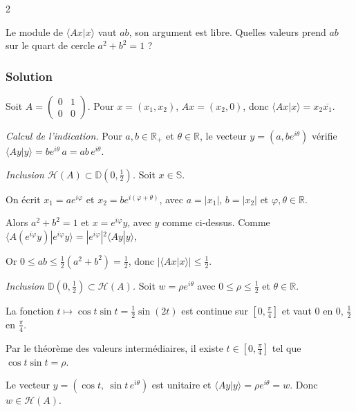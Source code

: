 \documentclass[11pt,a4paper]{article}
\newcommand{\equationajustee}[1]{%
  \sbox{\boiteequation}{$\displaystyle #1$}%
  \ifdim\wd\boiteequation>\linewidth
    \[\resizebox{\linewidth}{!}{\usebox{\boiteequation}}\]%
  \else
    \[#1\]%
  \fi}
\begin{document}
\begin{indication}{2}

Le module de \(\langle Ax|x\rangle\) vaut \(ab\), son argument est libre. Quelles valeurs prend \(ab\) sur le quart de cercle \(a^2+b^2=1\) ?

\end{indication}

\hypertarget{solution-20}{%
\subsubsection{Solution}\label{solution-20}}

Soit \(A=\begin{pmatrix}0&1\\0&0\end{pmatrix}\). Pour \(x=(x_1,x_2)\), \(Ax=(x_2,0)\), donc \(\langle Ax|x\rangle=x_2\overline{x_1}\).

\emph{Calcul de l'indication.} Pour \(a,b\in\mathbb R_+\) et \(\theta\in\mathbb R\), le vecteur \(y=(a,be^{i\theta})\) vérifie \(\langle Ay|y\rangle=be^{i\theta}\,a=ab\,e^{i\theta}\).

\emph{Inclusion \(\mathcal H(A)\subset\mathbb D(0,\frac12)\).} Soit \(x\in\mathbb S\).

On écrit \(x_1=ae^{i\varphi}\) et \(x_2=be^{i(\varphi+\theta)}\), avec \(a=|x_1|\), \(b=|x_2|\) et \(\varphi,\theta\in\mathbb R\).

Alors \(a^2+b^2=1\) et \(x=e^{i\varphi}y\), avec \(y\) comme ci-dessus. Comme \(\langle A(e^{i\varphi}y)|e^{i\varphi}y\rangle=|e^{i\varphi}|^2\langle Ay|y\rangle\),

\equationajustee{\langle Ax|x\rangle=ab\,e^{i\theta}.}

Or \(0\le ab\le\frac12(a^2+b^2)=\frac12\), donc \(|\langle Ax|x\rangle|\le\frac12\).

\emph{Inclusion \(\mathbb D(0,\frac12)\subset\mathcal H(A)\).} Soit \(w=\rho e^{i\theta}\) avec \(0\le\rho\le\frac12\) et \(\theta\in\mathbb R\).

La fonction \(t\mapsto\cos t\sin t=\frac12\sin(2t)\) est continue sur \([0,\frac\pi4]\) et vaut \(0\) en \(0\), \(\frac12\) en \(\frac\pi4\).

Par le théorème des valeurs intermédiaires, il existe \(t\in[0,\frac\pi4]\) tel que \(\cos t\sin t=\rho\).

Le vecteur \(y=(\cos t,\ \sin t\,e^{i\theta})\) est unitaire et \(\langle Ay|y\rangle=\rho e^{i\theta}=w\). Donc \(w\in\mathcal H(A)\).
\end{document}
